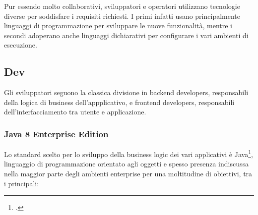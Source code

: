 Pur essendo molto collaborativi, sviluppatori e operatori utilizzano tecnologie diverse per soddisfare i requisiti richiesti. I primi infatti usano principalmente linguaggi di programmazione per sviluppare le nuove funzionalità, mentre i secondi adoperano anche linguaggi dichiarativi per configurare i vari ambienti di esecuzione.
\subsection{Dev}
Gli sviluppatori seguono la classica divisione in backend developers, responsabili della logica di business dell'appplicativo, e frontend developers, responsabili dell'interfacciamento tra utente e applicazione.
\subsubsection{Java 8 Enterprise Edition}
Lo standard scelto per lo sviluppo della business logic dei vari applicativi è Java\footcite{site:java}, linguaggio di programmazione orientato agli oggetti e spesso presenza indiscussa nella maggior parte degli ambienti enterprise per una moltitudine di obiettivi, tra i principali:
